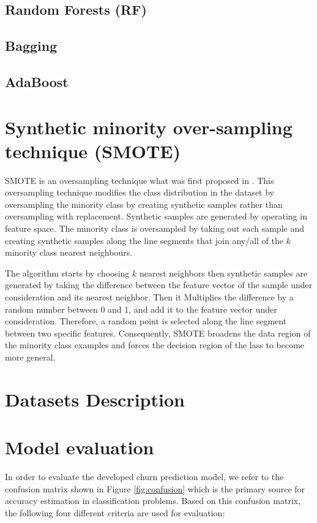\documentclass[runningheads,a4paper]{llncs}
\begin{document}
\subsection{Random Forests (RF)}
\subsection{Bagging}
\subsection{AdaBoost}

\section{Synthetic minority over-sampling technique (SMOTE)}

SMOTE is an oversampling technique what was first proposed in \cite{chawla2002smote}. This oversampling technique modifies the class distribution in the dataset by oversampling the minority class by creating synthetic samples rather than oversampling with replacement. Synthetic samples are generated by operating in feature space.
The minority class is oversampled by taking out each sample and creating synthetic samples along the line segments that join any/all of the $k$ minority class nearest neighbours. 

The algorithm starts by choosing $k$ nearest neighbors then synthetic samples
are generated by taking the difference between the feature vector of the sample
under consideration and its nearest neighbor. Then it Multiplies the difference by a random number between 0 and 1, and add it to the feature vector under consideration. Therefore, a random point is selected along the line segment between two specific features. Consequently, SMOTE broadens the data region of the minority class examples and forces the decision region of the lass to become more general.



\section{Datasets Description}
\label{data}




\section{Model evaluation}
\label{evaluation_criteria}
In order to evaluate the developed churn prediction model, we refer to the confusion matrix shown in Figure \ref{fig:confusion} which is the primary source for accuracy estimation in classification problems. Based on this confusion matrix, the following four different criteria are used for evaluation:
\end{document}
